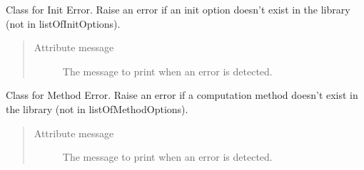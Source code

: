 \documentclass[letterpaper,10pt,english]{sphinxmanual}
\begin{document}

\begin{fulllineitems}
\label{doc:PythonGedLib.InitError}
Class for Init Error. Raise an error if an init option doesn't exist in the library (not in listOfInitOptions).
\begin{quote}\begin{description}
\item[{Attribute message}] \leavevmode
The message to print when an error is detected.

\end{description}\end{quote}

\end{fulllineitems}


\begin{fulllineitems}
\label{doc:PythonGedLib.MethodError}
Class for Method Error. Raise an error if a computation method doesn't exist in the library (not in listOfMethodOptions).
\begin{quote}\begin{description}
\item[{Attribute message}] \leavevmode
The message to print when an error is detected.

\end{description}\end{quote}

\end{fulllineitems}

\end{document}
